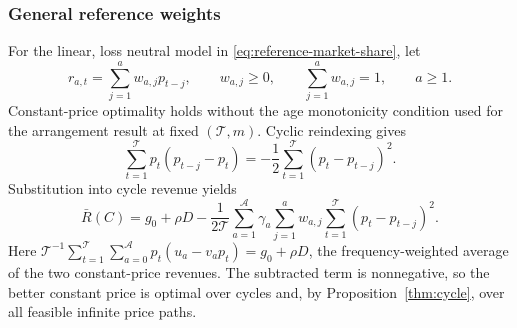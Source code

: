 \subsubsection{General reference weights}
\begingroup\color{blue}
For the linear, loss neutral model in \eqref{eq:reference-market-share}, let
\[
 r_{a,t}=\sum_{j=1}^a w_{a,j}p_{t-j},
 \qquad w_{a,j}\ge0,\qquad \sum_{j=1}^a w_{a,j}=1,\qquad a\ge1.
\]
Constant-price optimality holds without the age monotonicity condition used for the arrangement result at fixed \((\mathcal T,m)\). Cyclic reindexing gives
\[
 \sum_{t=1}^{\mathcal T}p_t(p_{t-j}-p_t)
 =-\frac12\sum_{t=1}^{\mathcal T}(p_t-p_{t-j})^2.
\]
Substitution into cycle revenue yields
\begin{equation}\label{eq:reference-variation-penalty}
 \bar R(C)=g_0+\rho D
 -\frac1{2\mathcal T}\sum_{a=1}^{\mathcal A}\gamma_a
 \sum_{j=1}^a w_{a,j}\sum_{t=1}^{\mathcal T}(p_t-p_{t-j})^2.
\end{equation}
Here \(\mathcal T^{-1}\sum_{t=1}^{\mathcal T}\sum_{a=0}^{\mathcal A}p_t(u_a-v_ap_t)=g_0+\rho D\), the frequency-weighted average of the two constant-price revenues. The subtracted term is nonnegative, so the better constant price is optimal over cycles and, by Proposition~\ref{thm:cycle}, over all feasible infinite price paths.
\par\endgroup
